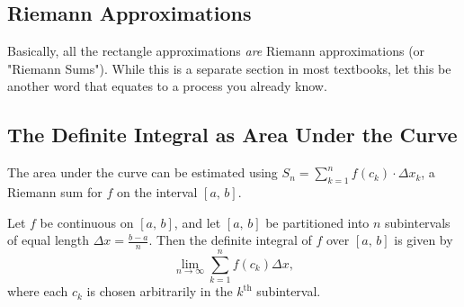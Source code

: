\documentclass[addpoints, 12pt]{exam}
\begin{document}

\subsection*{Riemann Approximations}
Basically, all the rectangle approximations \textit{are} Riemann approximations (or "Riemann Sums"). While this is a separate section in most textbooks, let this be another word that equates to a process you already know.



\newpage
{}
\subsection*{The Definite Integral as Area Under the Curve}

\begin{center}
\end{center}

The area under the curve can be estimated using $\displaystyle S_n=\sum_{k=1}^n f\left(c_k\right)\cdot\Delta x_k$, a Riemann sum for $f$ on the interval $[a,\,b].$

\begin{tcolorbox}[title= LIMIT DEFINITION OF THE DEFINITE INTEGRAL, black,sharp corners,colback=white,colbacktitle=white,coltitle=black,boxrule=1pt]

     Let $f$ be continuous on $[a,\,b]$, and let $[a,\,b]$ be partitioned into $n$ subintervals of equal length $\displaystyle \Delta x=\frac{b-a}{n}$. Then the definite integral of $f$ over $[a,\,b]$ is given by
     \[\lim_{n\to\infty}\sum_{k=1}^n f\left(c_k\right)\Delta x,\]
     where each $c_k$ is chosen arbitrarily in the $k^{\text{th}}$ subinterval.
    
\end{tcolorbox}
\end{document}
